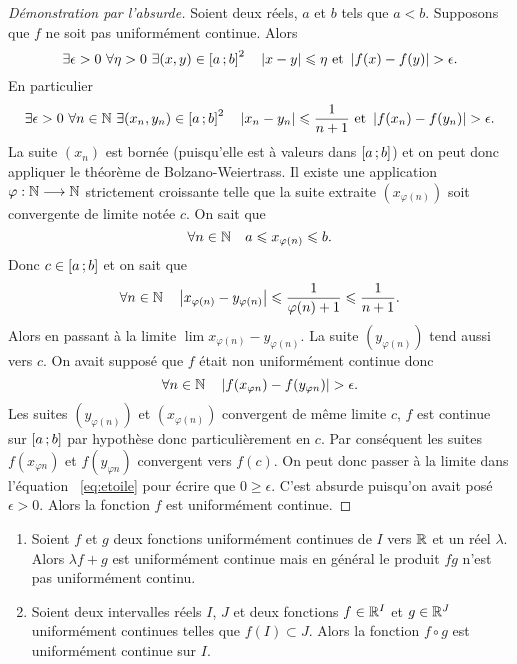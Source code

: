 \begin{proof}[Démonstration par l'absurde]
  Soient deux réels, \(a\) et \(b\) tels que \(a<b\). Supposons que \(f\) ne soit pas uniformément continue. Alors
  \begin{equation}
    \exists \epsilon > 0 \ \forall \eta > 0 \ \exists (x,y) \in \intervalleff{a}{b}^2 \quad \abs{x-y} \leqslant \eta \text{~et~} \abs{f(x)-f(y)} > \epsilon.
  \end{equation}
  En particulier
  \begin{equation}
    \exists \epsilon > 0 \ \forall n \in \N \ \exists (x_n,y_n) \in \intervalleff{a}{b}^2 \quad \abs{x_n-y_n} \leqslant \frac{1}{n+1} \text{~et~} \abs{f(x_n)-f(y_n)} > \epsilon.
  \end{equation}
  La suite \((x_n)\) est bornée (puisqu'elle est à valeurs dans \(\left[ a \, ;  b \right]\)) et on peut donc appliquer le théorème de Bolzano-Weiertrass. Il existe une application \(\varphi : \mathbb{N} \longrightarrow \mathbb{N}\) strictement croissante telle que la suite extraite \((x_{\varphi(n)})\) soit convergente de limite notée \(c\). On sait que
  \begin{equation}
    \forall n \in \mathbb{N} \quad a \leqslant x_{\varphi(n)} \leqslant b.
  \end{equation}
  Donc \(c \in \left[ a \, ;  b \right]\) et on sait que
  \begin{equation}
    \forall n \in \mathbb{N} \quad \left\lvert x_{\varphi(n)}-y_{\varphi(n)}\right\rvert \leqslant \frac{1}{\varphi(n)+1} \leqslant \frac{1}{n+1}.
  \end{equation}
  Alors en passant à la limite \(\lim x_{\varphi(n)}-y_{\varphi(n)}\). La suite \((y_{\varphi(n)})\) tend aussi vers \(c\). On avait supposé que \(f\) était non uniformément continue donc
  \begin{equation}\label{eq:etoile}
    \forall n \in \mathbb{N} \quad \left\lvert f(x_{\varphi{n}})-f(y_{\varphi{n}})\right\rvert > \epsilon.
  \end{equation}
  Les suites \((y_{\varphi(n)})\) et \((x_{\varphi(n)})\) convergent de même limite \(c\), \(f\) est continue sur \(\left[ a \, ;  b \right]\) par hypothèse donc particulièrement en \(c\). Par conséquent les suites \(f(x_{\varphi{n}})\) et \(f(y_{\varphi{n}})\) convergent vers \(f(c)\). On peut donc passer à la limite dans l'équation~
\ref{eq:etoile} pour écrire que \(0 \geqslant \epsilon\). C'est absurde puisqu'on avait posé \(\epsilon >0\). Alors la fonction \(f\) est uniformément continue.
\end{proof}
\begin{prop}
  \begin{enumerate}
  \item Soient \(f\) et \(g\) deux fonctions uniformément continues de \(I\) vers \(\mathbb{R}\) et un réel \(\lambda\). Alors \(\lambda f +g\) est uniformément continue mais en général le produit \(fg\) n'est pas uniformément continu.
  \item Soient deux intervalles réels \(I\), \(J\) et deux fonctions \(f \in \mathbb{R}^I\) et \(g\in \mathbb{R}^J\) uniformément continues telles que \(f(I)\subset J\). Alors la fonction \(f \circ g\) est uniformément continue sur \(I\).
  \end{enumerate}
\end{prop}
